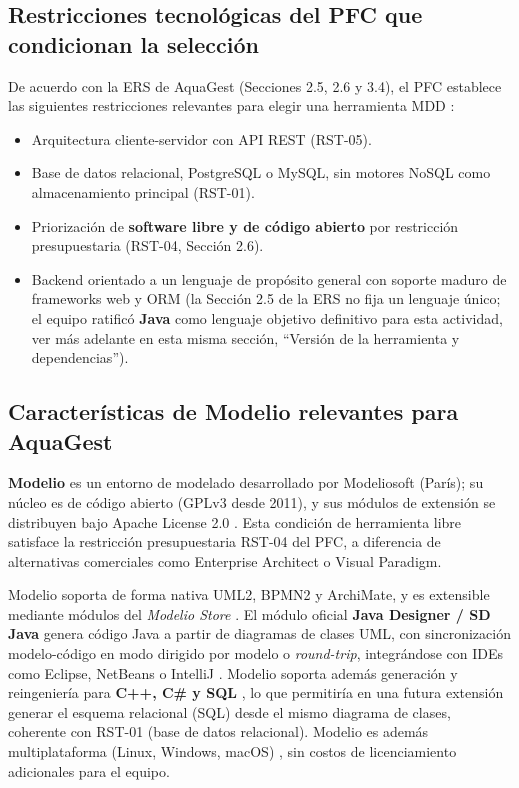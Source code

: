\documentclass[11pt,a4paper]{article}
\begin{document}
\subsection{Restricciones tecnológicas del PFC que condicionan la selección}
De acuerdo con la ERS de AquaGest (Secciones 2.5, 2.6 y 3.4), el PFC establece las
siguientes restricciones relevantes para elegir una herramienta MDD
\cite{aquagest2026}:
\begin{itemize}[leftmargin=1.5em]
    \item Arquitectura cliente-servidor con API REST (RST-05).
    \item Base de datos relacional, PostgreSQL o MySQL, sin motores NoSQL como
    almacenamiento principal (RST-01).
    \item Priorización de \textbf{software libre y de código abierto} por
    restricción presupuestaria (RST-04, Sección 2.6).
    \item Backend orientado a un lenguaje de propósito general con soporte maduro de
    frameworks web y ORM (la Sección 2.5 de la ERS no fija un lenguaje único; el
    equipo ratificó \textbf{Java} como lenguaje objetivo definitivo para esta
    actividad, ver más adelante en esta misma sección, ``Versión de la herramienta y
    dependencias'').
\end{itemize}

\subsection{Características de Modelio relevantes para AquaGest}
\textbf{Modelio} es un entorno de modelado desarrollado por Modeliosoft
(París); su núcleo es de código abierto (GPLv3 desde 2011), y sus módulos de
extensión se distribuyen bajo Apache License 2.0 \cite{modelio2024wiki}. Esta
condición de herramienta libre satisface la restricción presupuestaria RST-04
del PFC, a diferencia de alternativas comerciales como Enterprise Architect o
Visual Paradigm.

Modelio soporta de forma nativa UML2, BPMN2 y ArchiMate, y es extensible
mediante módulos del \textit{Modelio Store} \cite{modelio_org}. El módulo
oficial \textbf{Java Designer / SD Java} genera código Java a partir de
diagramas de clases UML, con sincronización modelo-código en modo dirigido por
modelo o \textit{round-trip}, integrándose con IDEs como Eclipse, NetBeans o
IntelliJ \cite{modelio_sd_java}. Modelio soporta además generación y
reingeniería para \textbf{C++, C\# y SQL} \cite{modelio_codegen}, lo que
permitiría en una futura extensión generar el esquema relacional (SQL) desde el
mismo diagrama de clases, coherente con RST-01 (base de datos relacional).
Modelio es además multiplataforma (Linux, Windows, macOS)
\cite{modelio2024wiki}, sin costos de licenciamiento adicionales para el
equipo.
\end{document}
